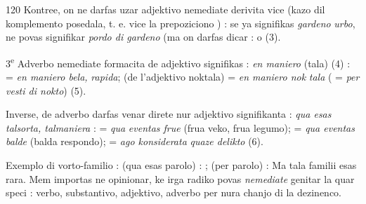 \begin{VUpage}[124]{120}
Kontree, on ne darfas uzar adjektivo nemediate derivita\nl
vice  (kazo dil komplemento posedala, t. e. vice la\nl
prepoziciono ) : se  ya signifikas \textit{gardeno}\cc
\textit{urbo},  ne povas signifikar \textit{pordo di gardeno}\nl
(ma on darfas dicar :  o  (3)\VUcorrige{}{)}.\parplein

3\textsuperscript{e} Adverbo nemediate formacita de adjektivo signifikas :\nl
\textit{en maniero} (tala) (4) :  = \textit{en maniero bela,}\nl
\textit{rapida};  (de l'adjektivo noktala) = \textit{en maniero nok}\cc
\textit{tala} ( = \textit{per vesti di nokto}) (5).

Inverse, de adverbo darfas venar direte nur adjektivo\nl
signifikanta : \textit{qua esas talsorta, talmaniera} :  = \textit{qua}\nl
\textit{eventas frue} (frua veko, frua legumo);  = \textit{qua eventas}\nl
\textit{balde} (balda respondo);  = \textit{ago konsiderata}\nl
\textit{quaze delikto} (6).

Exemplo di vorto-familio :  (qua\nl
esas parolo) : ;  (per parolo) : \cc
{} Ma tala familii esas rara. Mem importas ne\nl
opinionar, ke irga radiko povas \textit{nemediate} genitar la quar\nl
speci : verbo, substantivo, adjektivo, adverbo per nura chanjo\nl
di la dezinenco.
\end{VUpage}


